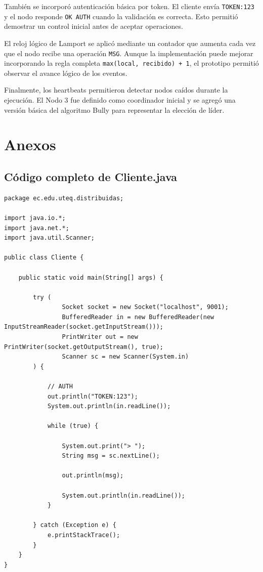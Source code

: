 \documentclass[12pt,a4paper]{article}
\begin{document}
También se incorporó autenticación básica por token. El cliente envía \texttt{TOKEN:123} y el nodo responde \texttt{OK AUTH} cuando la validación es correcta. Esto permitió demostrar un control inicial antes de aceptar operaciones.

El reloj lógico de Lamport se aplicó mediante un contador que aumenta cada vez que el nodo recibe una operación \texttt{MSG}. Aunque la implementación puede mejorar incorporando la regla completa \texttt{max(local, recibido) + 1}, el prototipo permitió observar el avance lógico de los eventos.

Finalmente, los heartbeats permitieron detectar nodos caídos durante la ejecución. El Nodo 3 fue definido como coordinador inicial y se agregó una versión básica del algoritmo Bully para representar la elección de líder.

\newpage
\section{Anexos}

\subsection{Código completo de Cliente.java}

\begin{lstlisting}[caption={Código completo de Cliente.java}]
package ec.edu.uteq.distribuidas;

import java.io.*;
import java.net.*;
import java.util.Scanner;

public class Cliente {

    public static void main(String[] args) {

        try (
                Socket socket = new Socket("localhost", 9001);
                BufferedReader in = new BufferedReader(new InputStreamReader(socket.getInputStream()));
                PrintWriter out = new PrintWriter(socket.getOutputStream(), true);
                Scanner sc = new Scanner(System.in)
        ) {

            // AUTH
            out.println("TOKEN:123");
            System.out.println(in.readLine());

            while (true) {

                System.out.print("> ");
                String msg = sc.nextLine();

                out.println(msg);

                System.out.println(in.readLine());
            }

        } catch (Exception e) {
            e.printStackTrace();
        }
    }
}
\end{lstlisting}
\end{document}
